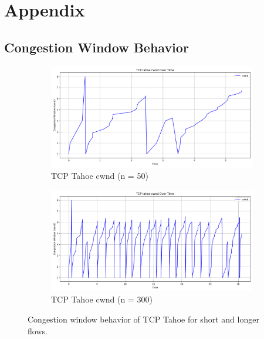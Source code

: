 \documentclass[conference]{IEEEtran}
\begin{document}
\newpage
\onecolumn
\appendix
\section{Appendix}
\subsection{Congestion Window Behavior} \label{sec:appendix_cwnd}
\begin{figure}[h!]
    \centering
    \begin{subfigure}[t]{0.48\textwidth}
        \centering
        \includegraphics[width=\linewidth]{assets/n50_tahoe_cwnd_over_time.png}
        \caption{TCP Tahoe cwnd (n = 50)}
        \label{fig:tahoe_n50}
    \end{subfigure}
    \hfill
    \begin{subfigure}[t]{0.48\textwidth}
        \centering
        \includegraphics[width=\linewidth]{assets/n300_tahoe_cwnd_over_time.png}
        \caption{TCP Tahoe cwnd (n = 300)}
        \label{fig:tahoe_n300}
    \end{subfigure}
    \caption{Congestion window behavior of TCP Tahoe for short and longer flows.}
    \label{fig:n_tahoe_cwnd}
\end{figure}
\end{document}
